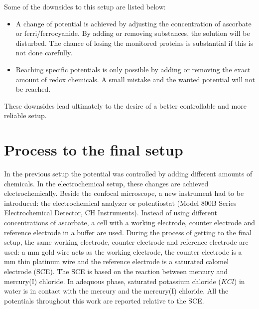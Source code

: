 \documentclass[twoside,single]{lion-msc}
\begin{document}
Some of the downsides to this setup are listed below:
\begin{itemize}
\item A change of potential is achieved by adjusting the concentration of ascorbate or ferri/ferrocyanide. By adding or removing substances, the solution will be disturbed. The chance of losing the monitored proteins is substantial if this is not done carefully. 
\item Reaching specific potentials is only possible by adding or removing the exact amount of redox chemicals. A small mistake and the wanted potential will not be reached. 
\end{itemize}

These downsides lead ultimately to the desire of a better controllable and more reliable setup. 

\section{Process to the final setup}

In the previous setup the potential was controlled by adding different amounts of chemicals. In the electrochemical setup, these changes are achieved electrochemically. Beside the confocal microscope, a new instrument had to be introduced: the electrochemical analyzer or potentiostat (Model 800B Series Electrochemical Detector, CH Instruments). Instead of using different concentrations of ascorbate, a cell with a working electrode, counter electrode and reference electrode in a buffer are used. During the process of getting to the final setup, the same working electrode, counter electrode and reference electrode are used: a  mm gold wire acts as the working electrode, the counter electrode is a  mm thin platinum wire and the reference electrode is a saturated calomel electrode (SCE). The SCE is based on the reaction between mercury and mercury(I) chloride. In adequous phase, saturated potassium chloride ($KCl$) in water is in contact with the mercury and the mercury(I) chloride. All the potentials throughout this work are reported relative to the SCE.
\end{document}
